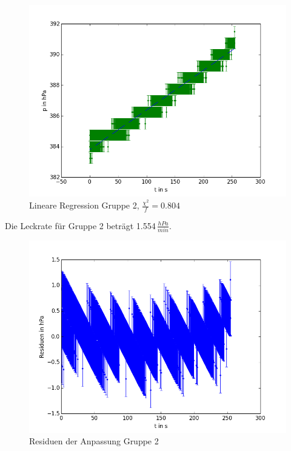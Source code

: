 \documentclass[11pt]{beamer}
\begin{document}
\begin{frame}
\begin{figure}[H]
\centering
\includegraphics[scale=0.5]{Bilder/dichtigkeit__EL.png}
\caption{Lineare Regression Gruppe 2, $\frac{\chi^2}{f}=0.804$}
\end{figure}
Die Leckrate für Gruppe 2 beträgt 1.554$\,\frac{hPa}{min}$.
\end{frame}

\begin{frame}
\begin{figure}[H]
\centering
\includegraphics[scale=0.5]{Bilder/residuen_dichtigkeit_EL.png}
\caption{Residuen der Anpassung Gruppe 2}
\end{figure}
\end{frame}
\end{document}
